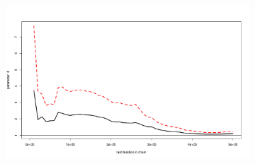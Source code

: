 \documentclass[paper=a4, fontsize=11pt]{scrartcl}
\numberwithin{equation}{section}		%
\numberwithin{figure}{section}			%
\numberwithin{table}{section}				%
\begin{document}
\begin{figure}[ht]
\begin{subfigure}{.5\textwidth}
\caption{}
\label{}
\end{subfigure}
\begin{subfigure}{.5\textwidth}
\includegraphics[scale=0.2]{scale_red_par4.png}
\caption{}
\label{}
\end{subfigure}
\caption{}
\label{Gelman-Rubin convergence plot}
\end{figure}
\end{document}
